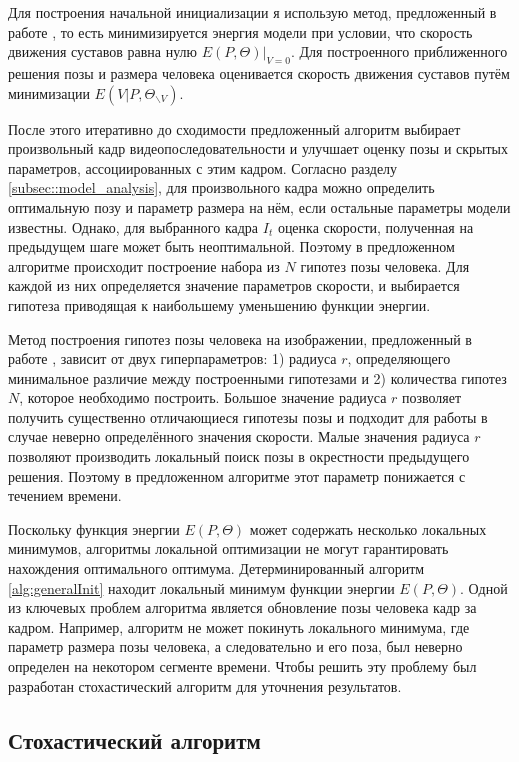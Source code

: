 Для построения начальной инициализации я использую метод, предложенный в работе \cite{park2011n}, то есть минимизируется энергия модели при условии, что скорость движения суставов равна нулю $E(P, \Theta)\bigg\rvert_{V=0}$. Для построенного приближенного решения позы и размера человека оценивается скорость движения суставов путём минимизации $E(V|P, \Theta_{\backslash V})$.

После этого итеративно до сходимости предложенный алгоритм выбирает произвольный кадр видеопоследовательности и улучшает оценку позы и скрытых параметров, ассоциированных с этим кадром. Согласно разделу \ref{subsec::model_analysis}, для произвольного кадра можно определить оптимальную позу и параметр размера на нём, если остальные параметры модели известны. Однако, для выбранного кадра $I_t$ оценка скорости, полученная на предыдущем шаге может быть неоптимальной. Поэтому в предложенном алгоритме происходит построение набора из $N$ гипотез позы человека. Для каждой из них определяется значение параметров скорости, и выбирается гипотеза приводящая к наибольшему уменьшению функции энергии.

Метод построения гипотез позы человека на изображении, предложенный в работе \cite{park2011n}, зависит от двух гиперпараметров: 1) радиуса $r$, определяющего минимальное различие между построенными гипотезами и 2) количества гипотез $N$, которое необходимо построить. Большое значение радиуса $r$ позволяет получить существенно отличающиеся гипотезы позы и подходит для работы в случае неверно определённого значения скорости. Малые значения радиуса $r$ позволяют производить локальный поиск позы в окрестности предыдущего решения. Поэтому в предложенном алгоритме этот параметр понижается с течением времени.

Поскольку функция энергии $E(P, \Theta)$ может содержать несколько локальных минимумов, алгоритмы локальной оптимизации не могут гарантировать нахождения оптимального оптимума. Детерминированный алгоритм \ref{alg:generalInit} находит локальный минимум функции энергии $E(P, \Theta)$. Одной из ключевых проблем алгоритма является обновление позы человека кадр за кадром. Например, алгоритм не может покинуть локального минимума, где параметр размера позы человека, а следовательно и его поза, был неверно определен на некотором сегменте времени. Чтобы решить эту проблему был разработан стохастический алгоритм для уточнения результатов.

\subsection{Стохастический алгоритм}

